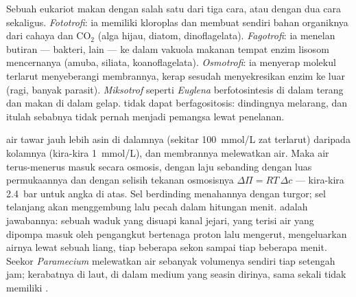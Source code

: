 \begin{definition}\label{def:b2:unicellular-diversity:nutrition}
Sebuah eukariot  makan dengan salah satu dari tiga cara,
atau dengan dua cara sekaligus. \emph{Fototrofi}: ia memiliki kloroplas
dan membuat sendiri bahan organiknya dari cahaya dan $\mathrm{CO_2}$
(alga hijau, diatom, dinoflagelata). \emph{Fagotrofi}: ia menelan
butiran --- bakteri,  lain --- ke dalam vakuola makanan tempat
enzim lisosom mencernanya (amuba, siliata, koanoflagelata).
\emph{Osmotrofi}: ia menyerap molekul terlarut menyeberangi membrannya,
kerap sesudah menyekresikan enzim ke luar (ragi, banyak parasit).
\emph{Miksotrof} seperti \emph{Euglena} berfotosintesis di dalam terang
dan makan di dalam gelap.  tidak dapat berfagositosis:
dindingnya melarang, dan itulah sebabnya  tidak pernah menjadi
pemangsa lewat penelanan.
\end{definition}

\begin{proposition}\label{prop:b2:unicellular-diversity:osmoregulation}
 air tawar jauh lebih asin di dalamnya (sekitar \qty{100}{mmol/L}
zat terlarut) daripada kolamnya (kira-kira \qty{1}{mmol/L}), dan
membrannya melewatkan air. Maka air terus-menerus masuk secara osmosis,
dengan laju sebanding dengan luas permukaannya dan dengan selisih
tekanan osmosisnya $\Delta\Pi = RT\,\Delta c$ --- kira-kira
\qty{2.4}{bar} untuk angka di atas. Sel berdinding menahannya dengan
turgor; sel telanjang akan menggembung lalu pecah dalam hitungan menit.
\emph{} adalah jawabannya: sebuah waduk yang disuapi
kanal jejari, yang terisi air yang dipompa masuk oleh pengangkut
bertenaga proton lalu mengerut, mengeluarkan airnya lewat sebuah liang,
tiap beberapa sekon sampai tiap beberapa menit. Seekor
\emph{Paramecium} melewatkan air sebanyak volumenya sendiri tiap
setengah jam; kerabatnya di laut, di dalam medium yang seasin dirinya,
sama sekali tidak memiliki .
\end{proposition}

